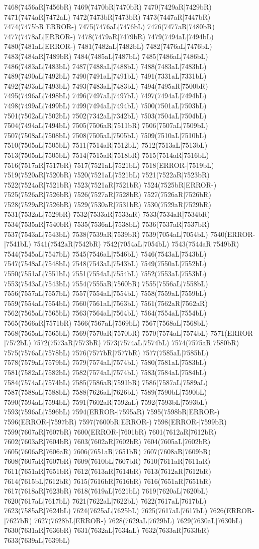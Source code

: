 7468(7456aR|7456bR) 7469(7470bR|7470bR) 7470(7429aR|7429bR) 7471(7474aR|7472aL) 7472(7473bR|7473bR) 7473(7447aR|7447bR) 7474(7475bR|ERROR-) 7475(7476aL|7476bL) 7476(7477aR|7480bR) 7477(7478aL|ERROR-) 7478(7479aR|7479bR) 7479(7494aL|7494bL) 7480(7481aL|ERROR-) 7481(7482aL|7482bL) 7482(7476aL|7476bL) 7483(7484aR|7489bR) 7484(7485aL|7487bL) 7485(7486aL|7486bL) 7486(7483aL|7483bL) 7487(7488aL|7488bL) 7488(7483aL|7483bL) 7489(7490aL|7492bL) 7490(7491aL|7491bL) 7491(7331aL|7331bL) 7492(7493aL|7493bL) 7493(7483aL|7483bL) 7494(7495aR|7500bR) 7495(7496aL|7498bL) 7496(7497aL|7497bL) 7497(7494aL|7494bL) 7498(7499aL|7499bL) 7499(7494aL|7494bL) 7500(7501aL|7503bL) 7501(7502aL|7502bL) 7502(7342aL|7342bL) 7503(7504aL|7504bL) 7504(7494aL|7494bL) 7505(7506aR|7511bR) 7506(7507aL|7509bL) 7507(7508aL|7508bL) 7508(7505aL|7505bL) 7509(7510aL|7510bL) 7510(7505aL|7505bL) 7511(7514aR|7512bL) 7512(7513aL|7513bL) 7513(7505aL|7505bL) 7514(7515aR|7518bR) 7515(7514aR|7516bL) 7516(7517aR|7517bR) 7517(7521aL|7521bL) 7518(ERROR-|7519bL) 7519(7520aR|7520bR) 7520(7521aL|7521bL) 7521(7522aR|7523bR) 7522(7524aR|7521bR) 7523(7521aR|7521bR) 7524(7525bR|ERROR-) 7525(7526aR|7526bR) 7526(7527aR|7528bR) 7527(7526aR|7526bR) 7528(7529aR|7526bR) 7529(7530aR|7531bR) 7530(7529aR|7529bR) 7531(7532aL|7529bR) 7532(7533aR|7533aR) 7533(7534aR|7534bR) 7534(7535aR|7540bR) 7535(7536aL|7538bL) 7536(7537aR|7537bR) 7537(7543aL|7543bL) 7538(7539aR|7539bR) 7539(7054aL|7054bL) 7540(ERROR-|7541bL) 7541(7542aR|7542bR) 7542(7054aL|7054bL) 7543(7544aR|7549bR) 7544(7545aL|7547bL) 7545(7546aL|7546bL) 7546(7543aL|7543bL) 7547(7548aL|7548bL) 7548(7543aL|7543bL) 7549(7550aL|7552bL) 7550(7551aL|7551bL) 7551(7554aL|7554bL) 7552(7553aL|7553bL) 7553(7543aL|7543bL) 7554(7555aR|7560bR) 7555(7556aL|7558bL) 7556(7557aL|7557bL) 7557(7554aL|7554bL) 7558(7559aL|7559bL) 7559(7554aL|7554bL) 7560(7561aL|7563bL) 7561(7562aR|7562aR) 7562(7565aL|7565bL) 7563(7564aL|7564bL) 7564(7554aL|7554bL) 7565(7566aR|7571bR) 7566(7567aL|7569bL) 7567(7568aL|7568bL) 7568(7565aL|7565bL) 7569(7570aR|7570bR) 7570(7574aL|7574bL) 7571(ERROR-|7572bL) 7572(7573aR|7573bR) 7573(7574aL|7574bL) 7574(7575aR|7580bR) 7575(7576aL|7578bL) 7576(7577bR|7577bR) 7577(7585aL|7585bL) 7578(7579aL|7579bL) 7579(7574aL|7574bL) 7580(7581aL|7583bL) 7581(7582aL|7582bL) 7582(7574aL|7574bL) 7583(7584aL|7584bL) 7584(7574aL|7574bL) 7585(7586aR|7591bR) 7586(7587aL|7589aL) 7587(7588aL|7588bL) 7588(7626aL|7626bL) 7589(7590bL|7590bL) 7590(7594aL|7594bL) 7591(7602aR|7592aL) 7592(7593bL|7593bL) 7593(7596aL|7596bL) 7594(ERROR-|7595aR) 7595(7598bR|ERROR-) 7596(ERROR-|7597bR) 7597(7600bR|ERROR-) 7598(ERROR-|7599bR) 7599(7607aR|7607bR) 7600(ERROR-|7601bR) 7601(7612aR|7612bR) 7602(7603aR|7604bR) 7603(7602aR|7602bR) 7604(7605aL|7602bR) 7605(7606aR|7606aR) 7606(7651aR|7651bR) 7607(7608aR|7609bR) 7608(7607aR|7607bR) 7609(7610bL|7607bR) 7610(7611aR|7611aR) 7611(7651aR|7651bR) 7612(7613aR|7614bR) 7613(7612aR|7612bR) 7614(7615bL|7612bR) 7615(7616bR|7616bR) 7616(7651aR|7651bR) 7617(7618aR|7623bR) 7618(7619aL|7621bL) 7619(7620aL|7620bL) 7620(7617aL|7617bL) 7621(7622aL|7622bL) 7622(7617aL|7617bL) 7623(7585aR|7624bL) 7624(7625aL|7625bL) 7625(7617aL|7617bL) 7626(ERROR-|7627bR) 7627(7628bL|ERROR-) 7628(7629aL|7629bL) 7629(7630aL|7630bL) 7630(7631aR|7636bR) 7631(7632aL|7634aL) 7632(7633aR|7633bR) 7633(7639aL|7639bL) 